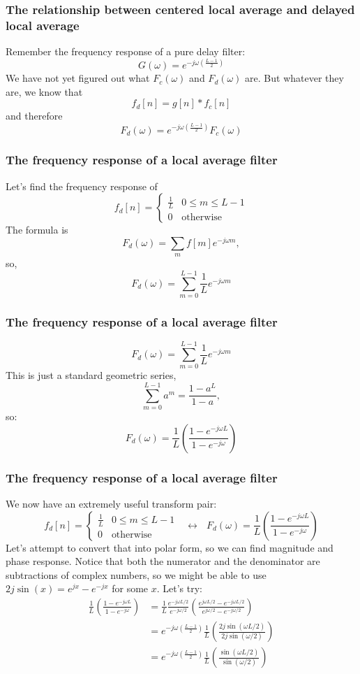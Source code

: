 \documentclass{beamer}
\begin{document}
\begin{frame}
  \frametitle{The relationship between centered local average and delayed local average}

  Remember the frequency response of a pure delay filter:
  \[
  G(\omega)  = e^{-j\omega\left(\frac{L-1}{2}\right)}
  \]
  We have not yet figured out what $F_c(\omega)$ and $F_d(\omega)$
  are.  But whatever they are, we know that
  \[
  f_d[n] = g[n]\ast f_c[n]
  \]
  and therefore
  \[
  F_d(\omega) = e^{-j\omega\left(\frac{L-1}{2}\right)} F_c(\omega)
  \]
\end{frame}
  
\begin{frame}
  \frametitle{The frequency response of a local average filter}

  Let's find the frequency response of
  \[
  f_d[n] = \begin{cases} \frac{1}{L}& 0\le m\le L-1\\
    0&\mbox{otherwise}\end{cases}
  \]
  The formula is
  \[
  F_d(\omega) = \sum_m f[m]e^{-j\omega m},
  \]
  so,
  \[
  F_d(\omega) = \sum_{m=0}^{L-1} \frac{1}{L}e^{-j\omega m}
  \]
\end{frame}
  
\begin{frame}
  \frametitle{The frequency response of a local average filter}

  \[
  F_d(\omega) = \sum_{m=0}^{L-1} \frac{1}{L}e^{-j\omega m}
  \]
  This is just a standard geometric series,
  \[
  \sum_{m=0}^{L-1} a^m = \frac{1-a^L}{1-a},
  \]
  so:
  \[
  F_d(\omega) = \frac{1}{L}\left(\frac{1-e^{-j\omega L}}{1-e^{-j\omega}}\right)
  \]
\end{frame}
  
\begin{frame}
  \frametitle{The frequency response of a local average filter}

  We now have an extremely  useful transform pair:
  \[
  f_d[n] = \begin{cases} \frac{1}{L}& 0\le m\le L-1\\
    0&\mbox{otherwise}\end{cases}~~~\leftrightarrow~~~
  F_d(\omega) = \frac{1}{L}\left(\frac{1-e^{-j\omega L}}{1-e^{-j\omega}}\right)
  \]
  Let's attempt to convert that into polar form, so we can find
  magnitude and phase response. Notice that both the numerator and the
  denominator are subtractions of complex numbers, so we might be able
  to use $2j\sin(x)=e^{jx}-e^{-jx}$ for some $x$.  Let's try:
  \begin{align*}
    \frac{1}{L}\left(\frac{1-e^{-j\omega L}}{1-e^{-j\omega}}\right)
    &= \frac{1}{L}\frac{e^{-j\omega L/2}}{e^{-j\omega/2}}
    \left(\frac{e^{j\omega L/2}-e^{-j\omega L/2}}{e^{j\omega/2}-e^{-j\omega/2}}\right)\\
    &= e^{-j\omega\left(\frac{L-1}{2}\right)}\frac{1}{L}
    \left(\frac{2j\sin(\omega L/2)}{2j\sin(\omega/2)}\right)\\
    &= e^{-j\omega\left(\frac{L-1}{2}\right)}\frac{1}{L}
    \left(\frac{\sin(\omega L/2)}{\sin(\omega/2)}\right)
  \end{align*}
\end{frame}
  
\end{document}
